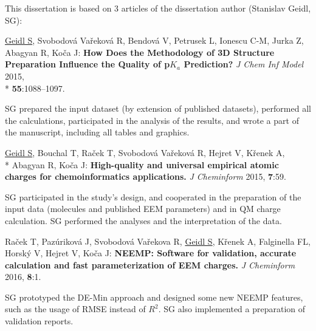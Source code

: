 \documentclass[11pt,b5paper,oneside,final]{book}
\begin{document}
This dissertation is based on 3 articles of the dissertation author (Stanislav Geidl, SG): 

\vspace{10mm}

\underline{Geidl S}, Svobodová Vařeková R, Bendová V, Petrusek L, Ionescu C-M,
Jurka Z, Abagyan R, Koča J: \textbf{How Does the Methodology of 3D Structure
Preparation Influence the Quality of p$K_a$ Prediction?} \textit{J Chem Inf Model}
2015, \\* \textbf{55}:1088–1097.

\vspace{5mm}

SG prepared the input dataset (by extension of published datasets), performed
all the calculations, participated in the analysis of the results, and wrote
a part of the manuscript, including all tables and graphics.

\vspace{10mm}

\underline{Geidl S}, Bouchal T, Raček T, Svobodová Vařeková R, Hejret V,
Křenek A,\\* Abagyan R, Koča J: \textbf{High-quality and universal empirical atomic
charges for chemoinformatics applications.} \textit{J Cheminform} 2015,
\textbf{7}:59.

\vspace{5mm}

SG participated in the study's design, and cooperated in the preparation of
the input data (molecules and published EEM parameters) and in QM charge 
calculation. SG performed the analyses and the interpretation of the data.

\vspace{10mm}

Raček T, Pazúriková J, Svobodová Vařekova R, \underline{Geidl S}, Křenek A,
Falginella FL, Horský V, Hejret V, Koča J: \textbf{NEEMP: Software
for validation, accurate calculation and fast parameterization of EEM charges.}
\textit{J Cheminform} 2016, \textbf{8}:1.

\vspace{5mm}

SG prototyped the DE-Min approach and designed some new NEEMP features, such as
the usage of RMSE instead of $R^2$. SG also implemented a preparation of validation
reports.

\clearpage

\tableofcontents

\clearpage
{}
\end{document}
